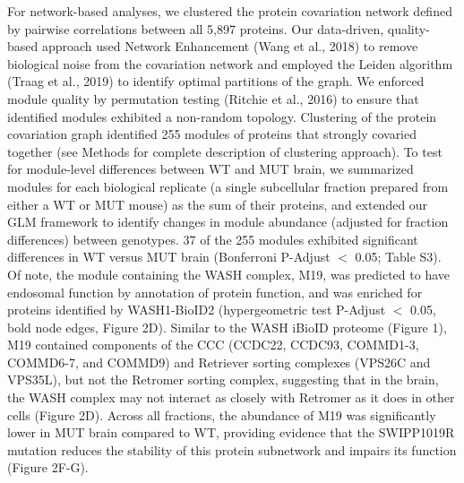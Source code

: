 For network-based analyses, we clustered the protein covariation network defined
by pairwise correlations between all 5,897 proteins. Our data-driven,
quality-based approach used Network Enhancement (Wang et al., 2018) to remove
biological noise from the covariation network and employed the Leiden algorithm
(Traag et al., 2019) to identify optimal partitions of the graph. We enforced
module quality by permutation testing (Ritchie et al., 2016) to ensure that
identified modules exhibited a non-random topology. Clustering of the protein
covariation graph identified 255 modules of proteins that strongly covaried
together (see Methods for complete description of clustering approach). 
To test for module-level differences between WT and MUT brain, we summarized
modules for each biological replicate (a single subcellular fraction prepared
from either a WT or MUT mouse) as the sum of their proteins, and extended our
GLM framework to identify changes in module abundance (adjusted for fraction
differences) between genotypes. 37 of the 255 modules exhibited significant
differences in WT versus MUT brain (Bonferroni P-Adjust  $<$ 0.05; Table S3). Of
note, the module containing the WASH complex, M19, was predicted to have
endosomal function by annotation of protein function, and was enriched for
proteins identified by WASH1-BioID2 (hypergeometric test P-Adjust $<$ 0.05, bold
node edges, Figure 2D). Similar to the WASH iBioID proteome (Figure 1), M19
contained components of the CCC (CCDC22, CCDC93, COMMD1-3, COMMD6-7, and COMMD9)
and Retriever sorting complexes (VPS26C and VPS35L), but not the Retromer
sorting complex, suggesting that in the brain, the WASH complex may not interact
as closely with Retromer as it does in other cells (Figure 2D). Across all
fractions, the abundance of M19 was significantly lower in MUT brain compared to
WT, providing evidence that the SWIPP1019R mutation reduces the stability of
this protein subnetwork and impairs its function (Figure 2F-G). 

